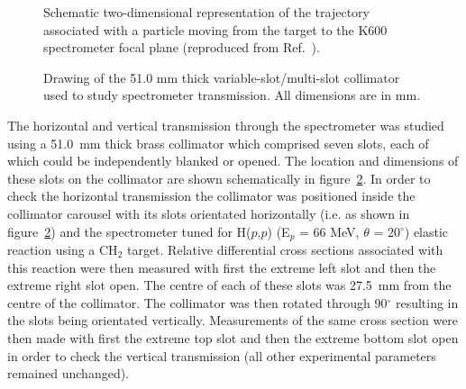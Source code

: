 \documentclass[11pt]{report}
\begin{document}
\begin{figure}
\centerline{\vspace{0cm}\hspace{0cm}
}
\centering
\caption{Schematic two-dimensional 
representation of the trajectory associated with a particle
 moving from the target to the K600 spectrometer focal plane
(reproduced from Ref.~\cite{Sch86}).}
\label{fig:vertical-acceptance}
\end{figure} 

\begin{figure}
\centerline{\vspace{0cm}\hspace{0cm}
}
\centering
\caption{Drawing of the 51.0 mm thick variable-slot/multi-slot collimator used to study
spectrometer transmission. All dimensions are in mm.}
\label{fig:variable-slot-collimator}
\end{figure} 


The horizontal and vertical transmission through the spectrometer was
studied  using a 51.0~mm thick brass collimator 
which comprised seven slots, each of which could be 
independently blanked or
opened. The location and dimensions of these slots on the collimator
are shown schematically in figure~\ref{fig:variable-slot-collimator}.
In order to check the horizontal transmission the collimator was positioned
inside the collimator carousel with its  slots orientated 
horizontally (i.e. as shown in figure~\ref{fig:variable-slot-collimator}) and
the
spectrometer tuned for H($p$,$p$) (E$_{p}$ = 66 MeV, $\theta$ = 20$^{\circ}$)
elastic reaction using a CH$_{2}$ target.
Relative differential cross 
sections
associated with this
reaction were then measured with first the extreme left slot
and then the extreme right slot open. The centre of each of these slots
was 27.5~mm from the centre of the collimator. 
The collimator was then 
rotated through 90$^{\circ}$ resulting in the
slots being orientated vertically.
Measurements of the same cross section were then made with first the
extreme top slot and then the extreme bottom slot  open in order to check the 
vertical
transmission (all other experimental parameters 
remained unchanged).
\end{document}
